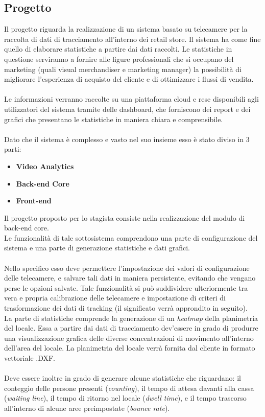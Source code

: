 \subsection{Progetto} \label{ssec:progetto}
Il progetto riguarda la realizzazione di un sistema basato su telecamere per la raccolta di dati di tracciamento all'interno dei retail store. Il sistema ha come fine quello di elaborare statistiche a partire dai dati raccolti. Le statistiche in questione serviranno a fornire alle figure professionali che si occupano del marketing (quali visual merchandiser e marketing manager) la possibilità di migliorare l'esperienza di acquisto del cliente e di ottimizzare i flussi di vendita.\\ \\
Le informazioni verranno raccolte su una piattaforma cloud e rese disponibili agli utilizzatori del sistema tramite delle dashboard, che forniscono dei report e dei grafici che presentano le statistiche in maniera chiara e comprensibile. \\ \\
Dato che il sistema è complesso e vasto nel suo insieme esso è stato diviso in 3 parti:
\begin{itemize}
	\item \textbf{Video Analytics}
	\item \textbf{Back-end Core}
	\item \textbf{Front-end}
\end{itemize}
Il progetto proposto per lo stagista consiste nella realizzazione del modulo di back-end core.\\
Le funzionalità di tale sottosistema comprendono una parte di configurazione del sistema e una parte di generazione statistiche e dati grafici. \\ \\
Nello specifico esso deve permettere l'impostazione dei valori di configurazione delle telecamere, e salvare tali dati in maniera persistente, evitando che vengano perse le opzioni salvate. Tale funzionalità si può suddividere ulteriormente tra vera e propria calibrazione delle telecamere e impostazione di criteri di trasformazione dei dati di tracking (il significato verrà approndito in seguito). \\
La parte di statistiche comprende la generazione di un \textit{heatmap} della planimetria del locale. Essa a partire dai dati di tracciamento dev'essere in grado di produrre una visualizzazione grafica delle diverse concentrazioni di movimento all'interno dell'area del locale. La planimetria del locale verrà fornita dal cliente in formato vettoriale .DXF. \\ \\Deve essere inoltre in grado di generare alcune statistiche che riguardano: il conteggio delle persone presenti (\textit{counting}), il tempo di attesa davanti alla cassa (\textit{waiting line}), il tempo di ritorno nel locale (\textit{dwell time}), e il tempo trascorso all'interno di alcune aree preimpostate (\textit{bounce rate}).\\

